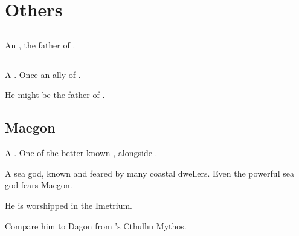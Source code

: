 \chapter{Others}















\section{\HesodNerga}
\index{\HesodNerga}
An \ophidian{}, the father of .
















\section{\Iurzmacul}
\index{\Iurzmacul}
A \nagalord. 
Once an ally of \TyarithXserasshana. 

He might be the father of .



















\section{Maegon}
A \nagalord. 
One of the better known \nagalords, alongside . 

A sea god, known and feared by many coastal dwellers. 
Even the powerful sea god  fears Maegon. 

He is worshipped in the Imetrium. 

Compare him to Dagon from \HPLovecraft's Cthulhu Mythos. 















